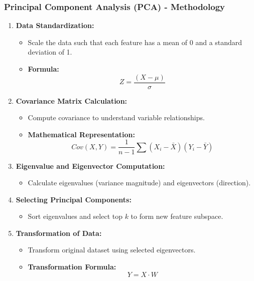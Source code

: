 \documentclass[aspectratio=169]{beamer}
\begin{document}
\begin{frame}[fragile]
  \frametitle{Principal Component Analysis (PCA) - Methodology}
  \begin{enumerate}
    \item \textbf{Data Standardization:}
      \begin{itemize}
        \item Scale the data such that each feature has a mean of 0 and a standard deviation of 1.
        \item \textbf{Formula:}
        \begin{equation}
          Z = \frac{(X - \mu)}{\sigma}
        \end{equation}
      \end{itemize}
    
    \item \textbf{Covariance Matrix Calculation:}
      \begin{itemize}
        \item Compute covariance to understand variable relationships.
        \item \textbf{Mathematical Representation:}
        \begin{equation}
          Cov(X, Y) = \frac{1}{n-1} \sum (X_i - \bar{X})(Y_i - \bar{Y})
        \end{equation}
      \end{itemize}
    
    \item \textbf{Eigenvalue and Eigenvector Computation:} 
      \begin{itemize}
        \item Calculate eigenvalues (variance magnitude) and eigenvectors (direction).
      \end{itemize}

    \item \textbf{Selecting Principal Components:} 
      \begin{itemize}
        \item Sort eigenvalues and select top \(k\) to form new feature subspace.
      \end{itemize}

    \item \textbf{Transformation of Data:}
      \begin{itemize}
        \item Transform original dataset using selected eigenvectors.
        \item \textbf{Transformation Formula:}
        \begin{equation}
          Y = X \cdot W
        \end{equation}
      \end{itemize}
  \end{enumerate}
\end{frame}
\end{document}
